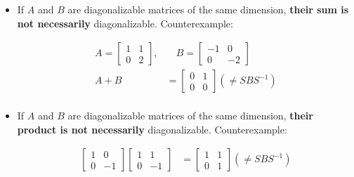 \documentclass[12pt]{article}
\begin{document}
{\begin{itemize}
    \begin{align*}
        A &= SDS^{-1}\\
        A^{\red{-1}} &= (SDS^{-1})^{\red{-1}}\\
        &= S^{-1}D^{-1}S\\
    \end{align*}

    Thus, we can write $A^{-1}$ in the form required for it to be diagonalizable. We can also see that $A^{-1}$ has the same eigenvalues as $A$ but raised to the power of $-1$.
    \item If $A$ and $B$ are diagonalizable matrices of the same dimension, \textbf{their sum is not necessarily} diagonalizable. Counterexample:

    \begin{align*}
        A = \begin{bmatrix}
            1 & 1\\
            0 & 2
        \end{bmatrix}, &\quad B = \begin{bmatrix}
            -1 & 0\\
            0 & -2
        \end{bmatrix}\\
        A + B &= \begin{bmatrix}
            0 & 1\\
            0 & 0
        \end{bmatrix} (\neq SBS^{-1})\\
    \end{align*}
    \item If $A$ and $B$ are diagonalizable matrices of the same dimension, \textbf{their product is not necessarily} diagonalizable. Counterexample:
    
    \begin{align*}
        \begin{bmatrix}
            1 & 0\\
            0 & -1
        \end{bmatrix}\begin{bmatrix}
            1 & 1\\
            0 & -1
        \end{bmatrix} &= \begin{bmatrix}
            1 & 1\\
            0 & 1
        \end{bmatrix} (\neq SBS^{-1})\\
    \end{align*}
\end{itemize}

}
\end{document}
